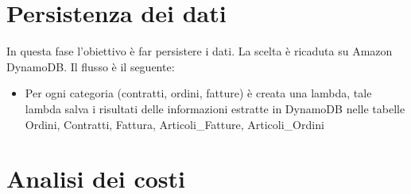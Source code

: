 \section{Persistenza dei dati}
In questa fase l'obiettivo è far persistere i dati. La scelta è ricaduta su Amazon DynamoDB. Il flusso è il seguente:
\begin{itemize}
    \item Per ogni categoria (contratti, ordini, fatture) è creata una lambda, tale lambda salva i risultati delle informazioni estratte in DynamoDB nelle tabelle Ordini, Contratti, Fattura, Articoli\_Fatture, Articoli\_Ordini
\end{itemize}

\section{Analisi dei costi}
%
%
%
%
%
%
%
%
%
%
